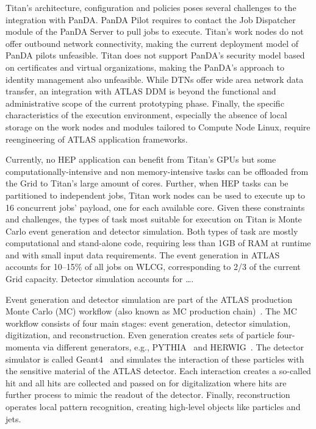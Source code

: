 Titan's architecture, configuration and policies poses several challenges to the
integration with PanDA. PanDA Pilot requires to contact the Job Dispatcher
module of the PanDA Server to pull jobs to execute. Titan's work nodes do not
offer outbound network connectivity, making the current deployment model of
PanDA pilots unfeasible. Titan does not support PanDA's security model based on
certificates and virtual organizations, making the PanDA's approach to identity
management also unfeasible. While DTNs offer wide area network data transfer, an
integration with ATLAS DDM is beyond the functional and administrative scope of
the current prototyping phase. Finally, the specific characteristics of the
execution environment, especially the absence of local storage on the work nodes
and modules tailored to Compute Node Linux, require reengineering of ATLAS
application frameworks.

Currently, no HEP application can benefit from Titan's GPUs but some
computationally-intensive and non memory-intensive tasks can be offloaded from
the Grid to Titan's large amount of cores. Further, when HEP tasks can be
partitioned to independent jobs, Titan work nodes can be used to execute up to
16 concurrent jobs' payload, one for each available core. Given these
constraints and challenges, the types of task most suitable for execution on
Titan is Monte Carlo event generation and detector simulation. Both types of
task are mostly computational and stand-alone code, requiring less than 1GB of
RAM at runtime and with small input data requirements. The event generation in
ATLAS accounts for 10--15\% of all jobs on WLCG, corresponding to 2/3 of the
current Grid capacity. Detector simulation accounts for \ldots .


Event generation and detector simulation are part of the ATLAS production Monte
Carlo (MC) workflow (also known as MC production chain)~\cite{mcworkflow}. The
MC workflow consists of four main stages: event generation, detector simulation,
digitization, and reconstruction. Even generation creates sets of particle
four-momenta via different generators, e.g., PYTHIA~\cite{herwig} and
HERWIG~\cite{herwig}. The detector simulator is called Geant4~\cite{geant4} and
simulates the interaction of these particles with the sensitive material of the
ATLAS detector. Each interaction creates a so-called hit and all hits are
collected and passed on for digitalization where hits are further process to
mimic the readout of the detector. Finally, reconstruction operates local
pattern recognition, creating high-level objects like particles and jets.

